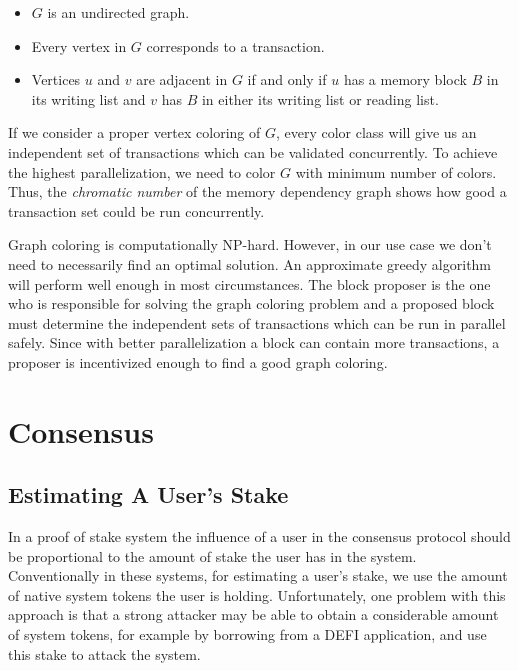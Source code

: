\documentclass[11pt, A4]{report}
\begin{document}
    \begin{itemize}
        \item \(G\) is an undirected graph.
        \item Every vertex in \(G\) corresponds to a transaction.
        \item Vertices \(u\) and \(v\) are adjacent in \(G\) if and only if \(u\) has a memory block \(B\) in its
        writing list and \(v\) has \(B\) in either its writing list or reading list.
    \end{itemize}

    If we consider a proper vertex coloring of \(G\), every color class will give us an independent set of
    transactions which can be validated concurrently. To achieve the highest parallelization, we need to color \(G\)
    with minimum number of colors. Thus, the \emph{chromatic number} of the memory dependency graph shows how good a
    transaction set could be run concurrently.

    Graph coloring is computationally NP-hard. However, in our use case we don't need to necessarily find an optimal
    solution. An approximate greedy algorithm will perform well enough in most circumstances. The block proposer is the
    one who is responsible for solving the graph coloring problem and a proposed block must determine the independent
    sets of transactions which can be run in parallel safely. Since with better parallelization a block can contain more
    transactions, a proposer is incentivized enough to find a good graph coloring.


    \section{Consensus}\label{sec:consensus}

    \subsection{Estimating A User's Stake}\label{subsec:estimating-a-user's-stake}

    In a proof of stake system the influence of a user in the consensus protocol should be proportional to the amount
    of stake the user has in the system. Conventionally in these systems, for estimating a user's stake, we use the
    amount of native system tokens the user is holding. Unfortunately, one problem with this approach is that a
    strong attacker may be able to obtain a considerable amount of system tokens, for example by borrowing from a
    DEFI application, and use this stake to attack the system.
\end{document}
